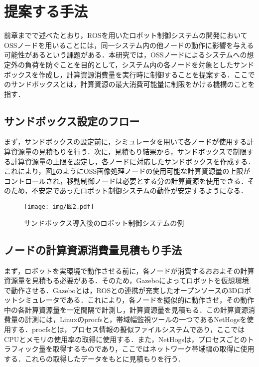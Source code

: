 \documentclass[11pt]{ujarticle} %
\begin{document}
\section{提案する手法}
前章までで述べたとおり，ROSを用いたロボット制御システムの開発においてOSSノードを用いることには，同一システム内の他ノードの動作に影響を与える可能性があるという課題がある．本研究では，OSSノードによるシステムへの想定外の負荷を防ぐことを目的として，システム内の各ノードを対象としたサンドボックスを作成し，計算資源消費量を実行時に制御することを提案する．ここでのサンドボックスとは，計算資源の最大消費可能量に制限をかける機構のことを指す．

\subsection{サンドボックス設定のフロー}
まず，サンドボックスの設定前に，シミュレータを用いて各ノードが使用する計算資源量の見積もりを行う．次に，見積もり結果から，サンドボックスで制限する計算資源量の上限を設定し，各ノードに対応したサンドボックスを作成する．これにより，図\ref{fig:after}のようにOSS画像処理ノードの使用可能な計算資源量の上限がコントロールされ，移動制御ノードは必要とする分の計算資源を使用できる．そのため，不安定であったロボット制御システムの動作が安定するようになる．

\begin{figure}[h]
   \centering
   \texttt{[image: img/図2.pdf]}
   \caption{サンドボックス導入後のロボット制御システムの例}
   \label{fig:after}
\end{figure}

\subsection{ノードの計算資源消費量見積もり手法}
まず，ロボットを実環境で動作させる前に，各ノードが消費するおおよその計算資源量を見積もる必要がある．そのため，Gazebo\cite{Gazebo}によってロボットを仮想環境で動作させる．Gazeboとは，ROSとの連携が充実したオープンソースの3Dロボットシミュレータである．これにより，各ノードを擬似的に動作させ，その動作中の各計算資源量を一定間隔で計測し，計算資源量を見積もる．この計算資源消費量の計測には，Linuxのprocfsと，帯域幅監視ツールの一つであるNetHogsを使用する．procfsとは，プロセス情報の擬似ファイルシステムであり，ここではCPUとメモリの使用率の取得に使用する．また，NetHogsは，プロセスごとのトラフィック量を取得するものであり，ここではネットワーク帯域幅の取得に使用する．これらの取得したデータをもとに見積もりを行う．
\end{document}
